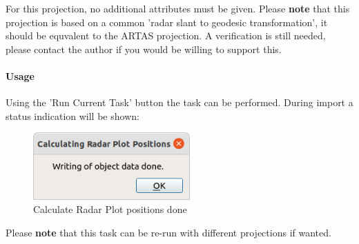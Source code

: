 For this projection, no additional attributes must be given. Please \textbf{note} that this projection is based on a common 'radar slant to geodesic transformation', it should be equvalent to the ARTAS projection. A verification is still needed, please contact the author if you would be willing to support this.

\paragraph{Usage}

Using the 'Run Current Task' button the task can be performed. During import a status indication will be shown:

\begin{figure}[H]
  \center
    \includegraphics[width=6cm]{figures/proc_calc_radar_done.png}
  \caption{Calculate Radar Plot positions done}
\end{figure}

Please \textbf{note} that this task can be re-run with different projections if wanted.

